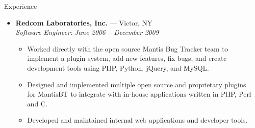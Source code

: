 \documentclass[11pt,oneside]{article}
\newenvironment{ressection}[1]{
	\vspace{8pt}
	{\fontfamily{phv}\selectfont\Large#1}
	\begin{itemize}
	\vspace{3pt}
}{
	\end{itemize}
}
\newcommand{\ressubitem}[1]{
	\vspace{-1pt}
	\item \begin{flushleft} #1 \end{flushleft}
}
\newcommand{\resbigitem}[3]{
	\vspace{-5pt}
	\item
	\textbf{#1} --- #2 \\
	\textit{#3}
}
\newenvironment{ressubsec}[3]{
	\resbigitem{#1}{#2}{#3}
	\vspace{-2pt}
	\begin{itemize}
}{
	\end{itemize}
}
\begin{document}
\begin{ressection}{Experience}

	\begin{ressubsec}{Redcom Laboratories, Inc.}{Victor, NY}
	{Software Engineer: June 2006 -- December 2009}
		\ressubitem{Worked directly with the open source Mantis Bug Tracker team to implement
		a plugin system, add new features, fix bugs, and create development tools using PHP, Python,
		jQuery, and MySQL.}
		\ressubitem{Designed and implemented multiple open source and proprietary plugins for MantisBT
		to integrate with in-house applications written in PHP, Perl and C.}
		\ressubitem{Developed and maintained internal web applications and developer tools.}
	\end{ressubsec}


\end{ressection}
\end{document}
